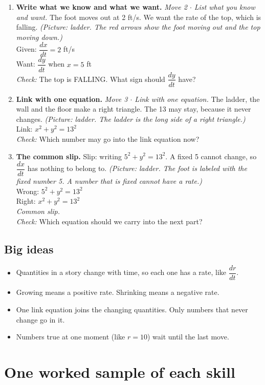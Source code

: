 \documentclass[11pt]{article}
\begin{document}
\begin{enumerate}
\item \textbf{Write what we know and what we want.} \textit{Move 2 $\cdot$ List what you know and want.} The foot moves out at 2 ft/s. We want the rate of the top, which is falling. \textit{(Picture: ladder. The red arrows show the foot moving out and the top moving down.)}\\ Given: $\dfrac{dx}{dt}=2$ ft/s\\ Want: $\dfrac{dy}{dt}$ when $x=5$ ft\\ \textit{Check:} The top is FALLING. What sign should $\dfrac{dy}{dt}$ have? 
\item \textbf{Link with one equation.} \textit{Move 3 $\cdot$ Link with one equation.} The ladder, the wall and the floor make a right triangle. The 13 may stay, because it never changes. \textit{(Picture: ladder. The ladder is the long side of a right triangle.)}\\ Link: $x^2+y^2=13^2$\\ \textit{Check:} Which number may go into the link equation now? 
\item \textbf{The common slip.} Slip: writing $5^2+y^2=13^2$. A fixed 5 cannot change, so $\dfrac{dx}{dt}$ has nothing to belong to. \textit{(Picture: ladder. The foot is labeled with the fixed number 5. A number that is fixed cannot have a rate.)}\\ Wrong: $5^2+y^2=13^2$\\ Right: $x^2+y^2=13^2$\\ \textit{Common slip.}\\ \textit{Check:} Which equation should we carry into the next part? 
\end{enumerate}
\subsection*{Big ideas}\begin{itemize}\item Quantities in a story change with time, so each one has a rate, like $\dfrac{dr}{dt}$.
\item Growing means a positive rate. Shrinking means a negative rate.
\item One link equation joins the changing quantities. Only numbers that never change go in it.
\item Numbers true at one moment (like $r=10$) wait until the last move.\end{itemize}
\section*{One worked sample of each skill}
\end{document}
